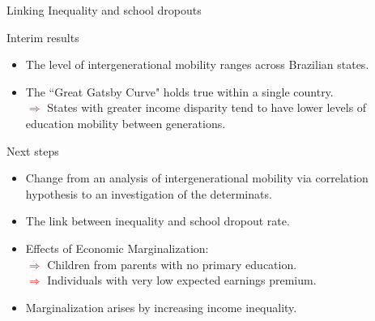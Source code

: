 \documentclass{beamer}
\begin{document}
\begin{frame} [label=main3]{Linking Inequality and school dropouts}
\begin{block}{Interim results}
\begin{itemize}
\item \footnotesize The level of intergenerational mobility ranges across Brazilian states.
\item \footnotesize The ``Great Gatsby Curve" holds true within a single country. \\ \tiny \textcolor{red}{$\Longrightarrow$} States with greater income disparity tend to have lower levels of education mobility between generations.
\end{itemize}
\end{block}

\hfill \break
\begin{block}{Next steps}
\begin{itemize}
\item \footnotesize Change from an analysis of intergenerational mobility via correlation hypothesis to an investigation of the determinats.
\item \footnotesize The link between inequality and school dropout rate.
\item \footnotesize Effects of Economic Marginalization:
\\ \tiny \textcolor{red}{$\Longrightarrow$} Children from parents with no primary education.
\\ \tiny \textcolor{red}{$\Longrightarrow$} Individuals with very low expected earnings premium.

\item \footnotesize Marginalization arises by increasing income inequality. \hyperlink{KearneyLevine}{\beamerbutton {\textcolor{red}{Ex-ante Model}}}
\end{itemize}
\end{block}
\end{frame}
\end{document}
